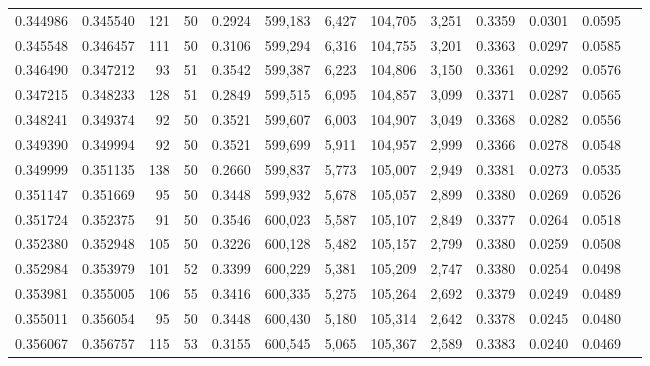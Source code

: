 \begin{tabular}{rrrrrrrrrrrrr}
0.344986 & 0.345540 &   121 &  50 &                                     0.2924 & 599,183 &   6,427 & 104,705 &   3,251 & 0.3359 & 0.0301 & 0.0595 \\
0.345548 & 0.346457 &   111 &  50 &                                     0.3106 & 599,294 &   6,316 & 104,755 &   3,201 & 0.3363 & 0.0297 & 0.0585 \\
0.346490 & 0.347212 &    93 &  51 &                                     0.3542 & 599,387 &   6,223 & 104,806 &   3,150 & 0.3361 & 0.0292 & 0.0576 \\
0.347215 & 0.348233 &   128 &  51 &                                     0.2849 & 599,515 &   6,095 & 104,857 &   3,099 & 0.3371 & 0.0287 & 0.0565 \\
0.348241 & 0.349374 &    92 &  50 &                                     0.3521 & 599,607 &   6,003 & 104,907 &   3,049 & 0.3368 & 0.0282 & 0.0556 \\
0.349390 & 0.349994 &    92 &  50 &                                     0.3521 & 599,699 &   5,911 & 104,957 &   2,999 & 0.3366 & 0.0278 & 0.0548 \\
0.349999 & 0.351135 &   138 &  50 &                                     0.2660 & 599,837 &   5,773 & 105,007 &   2,949 & 0.3381 & 0.0273 & 0.0535 \\
0.351147 & 0.351669 &    95 &  50 &                                     0.3448 & 599,932 &   5,678 & 105,057 &   2,899 & 0.3380 & 0.0269 & 0.0526 \\
0.351724 & 0.352375 &    91 &  50 &                                     0.3546 & 600,023 &   5,587 & 105,107 &   2,849 & 0.3377 & 0.0264 & 0.0518 \\
0.352380 & 0.352948 &   105 &  50 &                                     0.3226 & 600,128 &   5,482 & 105,157 &   2,799 & 0.3380 & 0.0259 & 0.0508 \\
0.352984 & 0.353979 &   101 &  52 &                                     0.3399 & 600,229 &   5,381 & 105,209 &   2,747 & 0.3380 & 0.0254 & 0.0498 \\
0.353981 & 0.355005 &   106 &  55 &                                     0.3416 & 600,335 &   5,275 & 105,264 &   2,692 & 0.3379 & 0.0249 & 0.0489 \\
0.355011 & 0.356054 &    95 &  50 &                                     0.3448 & 600,430 &   5,180 & 105,314 &   2,642 & 0.3378 & 0.0245 & 0.0480 \\
0.356067 & 0.356757 &   115 &  53 &                                     0.3155 & 600,545 &   5,065 & 105,367 &   2,589 & 0.3383 & 0.0240 & 0.0469 \\

\end{tabular}
